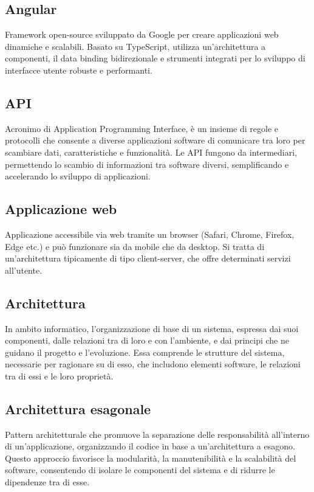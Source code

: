 \subsection*{Angular}
Framework open-source sviluppato da Google per creare applicazioni web dinamiche e scalabili. Basato su TypeScript, utilizza un'architettura a componenti, 
il data binding bidirezionale e strumenti integrati per lo sviluppo di interfacce utente robuste e performanti.

\hypertarget{sec:api}{}
\subsection*{API}
Acronimo di Application Programming Interface, è un insieme di regole e protocolli che consente a diverse applicazioni software di comunicare tra loro 
per scambiare dati, caratteristiche e funzionalità. Le API fungono da intermediari, permettendo lo scambio di informazioni tra software diversi, semplificando 
e accelerando lo sviluppo di applicazioni.

\hypertarget{sec:applicazione_web}{}
\subsection*{Applicazione web}
Applicazione accessibile via web tramite un browser (Safari, Chrome, Firefox, Edge etc.) e può funzionare sia da mobile che da desktop. Si tratta di un'architettura 
tipicamente di tipo client-server, che offre determinati servizi all'utente.

\hypertarget{sec:architettura}{}
\subsection*{Architettura}
In ambito informatico, l'organizzazione di base di un sistema, espressa dai suoi componenti, dalle relazioni tra di loro e con l'ambiente, 
e dai principi che ne guidano il progetto e l'evoluzione. Essa comprende le strutture del sistema, necessarie per ragionare su di esso, 
che includono elementi software, le relazioni tra di essi e le loro proprietà.

\hypertarget{sec:architettura_esagonale}{}
\subsection*{Architettura esagonale}
Pattern architetturale che promuove la separazione delle responsabilità all'interno di un'applicazione, organizzando il codice in base a un'architettura
a esagono. Questo approccio favorisce la modularità, la manutenibilità e la scalabilità del software, consentendo di isolare le componenti del sistema e
di ridurre le dipendenze tra di esse.

